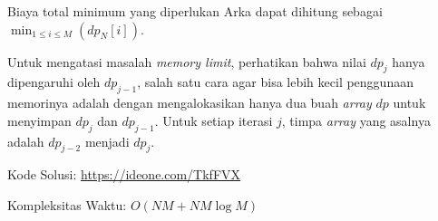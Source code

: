 Biaya total minimum yang diperlukan Arka dapat dihitung sebagai 
$\displaystyle \min_{1 \leq i \leq M} (dp_N[i])$.

Untuk mengatasi masalah \textit{memory limit}, perhatikan bahwa nilai $dp_j$ hanya dipengaruhi oleh $dp_{j-1}$, salah satu cara agar bisa lebih kecil penggunaan memorinya adalah dengan mengalokasikan hanya dua buah \textit{array} $dp$ untuk menyimpan $dp_j$ dan $dp_{j-1}$. Untuk setiap iterasi $j$, timpa \textit{array} yang asalnya adalah $dp_{j-2}$ menjadi $dp_j$.


Kode Solusi: \url{https://ideone.com/TkfFVX}

Kompleksitas Waktu: $O(NM + NM \log M)$